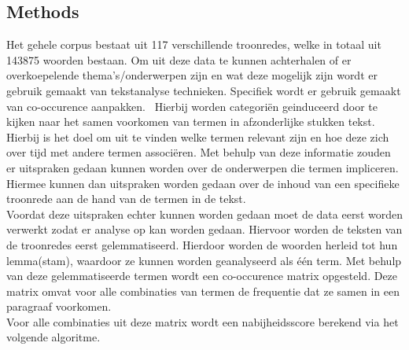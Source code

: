 \subsection{Methods}
Het gehele corpus bestaat uit 117 verschillende troonredes, welke in totaal uit 143875 woorden bestaan. 
Om uit deze data te kunnen achterhalen of er overkoepelende thema's/onderwerpen zijn en wat deze mogelijk zijn wordt er gebruik gemaakt van tekstanalyse technieken. Specifiek wordt er gebruik gemaakt van co-occurence aanpakken.~\cite{callon1991co} Hierbij worden categoriën geinduceerd door te kijken naar het samen voorkomen van termen in afzonderlijke stukken tekst.
 Hierbij is het doel om uit te vinden welke termen relevant zijn en hoe deze zich over tijd met andere termen associëren. Met behulp van deze informatie zouden er uitspraken gedaan kunnen worden over de onderwerpen die termen impliceren. Hiermee kunnen dan uitspraken worden gedaan over de inhoud van een specifieke troonrede aan de hand van de termen in de tekst. 
\\
Voordat deze uitspraken echter kunnen worden gedaan moet de data eerst worden verwerkt zodat er analyse op kan worden gedaan. Hiervoor worden de teksten van de troonredes eerst gelemmatiseerd. Hierdoor worden de woorden herleid tot hun lemma(stam), waardoor ze kunnen worden geanalyseerd als één term.  Met behulp van deze gelemmatiseerde termen wordt een co-occurence matrix opgesteld. Deze matrix omvat voor alle combinaties van termen  de frequentie dat ze samen in een paragraaf voorkomen. 
\\
Voor alle combinaties uit deze matrix wordt een nabijheidsscore berekend via het volgende algoritme.  

